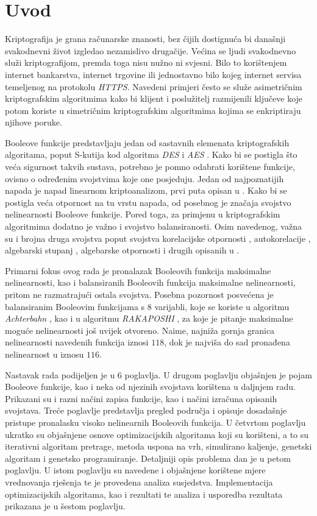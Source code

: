 \chapter{Uvod}
Kriptografija je grana računarske znanosti, bez čijih dostignuća bi današnji svakodnevni život izgledao nezamislivo drugačije.
Većina se ljudi svakodnevno služi kriptografijom, premda toga nisu nužno ni svjesni.
Bilo to korištenjem internet bankarstva, internet trgovine ili jednostavno bilo kojeg internet servisa temeljenog na protokolu \textit{HTTPS}.
Navedeni primjeri često se služe asimetričnim kriptografskim algoritmima kako bi klijent i poslužitelj razmijenili ključeve koje potom koriste u simetričnim kriptografskim algoritmima kojima se enkriptiraju njihove poruke.

Booleove funkcije predstavljaju jedan od sastavnih elemenata kriptografskih algoritama, poput S-kutija kod algoritma \textit{DES} i \textit{AES} \cite{daemen1999aes}.
Kako bi se postigla što veća sigurnost takvih sustava, potrebno je pomno odabrati korištene funkcije, ovisno o određenim svojstvima koje one posjeduju.
Jedan od najpoznatijih napada je napad linearnom kriptoanalizom, prvi puta opisan u \cite{golic1994linear}.
Kako bi se postigla veća otpornost na tu vrstu napada, od posebnog je značaja svojstvo nelinearnosti Booleove funkcije.
Pored toga, za primjenu u kriptografskim algoritmima dodatno je važno i svojstvo balansiranosti.
Osim navedenog, važna su i brojna druga svojstva poput svojstva korelacijske otpornosti , autokorelacije , algebarski stupanj , algebarske otpornosti  i drugih opisanih u \cite{CryptographicBooleanFunctions}.

Primarni fokus ovog rada je pronalazak Booleovih funkcija maksimalne nelinearnosti, kao i balansiranih Booleovih funkcija maksimalne nelinearnosti, pritom ne razmatrajući ostala svojstva.
Posebna pozornost posvećena je balansiranim Booleovim funkcijama s $8$ varijabli, koje se koriste u algoritmu \textit{Achterbahn} \cite{gammel2005achterbahn}, kao i u algoritmu \textit{RAKAPOSHI} \cite{cid2009rakaposhi}, za koje je pitanje maksimalne moguće nelinearnosti još uvijek otvoreno.
Naime, najniža gornja granica nelinearnosti navedenih funkcija iznosi $118$, dok je najviša do sad pronađena nelinearnost u iznosu $116$.

Nastavak rada podijeljen je u $6$ poglavlja.
U drugom poglavlju objašnjen je pojam Booleove funkcije, kao i neka od njezinih svojstava korištena u daljnjem radu.
Prikazani su i razni načini zapisa funkcije, kao i načini izračuna opisanih svojstava.
Treće poglavlje predstavlja pregled područja i opisuje dosadašnje pristupe pronalasku visoko nelinearnih Booleovih funkcija.
U četvrtom poglavlju ukratko su objašnjene osnove optimizacijskih algoritama koji su korišteni, a to su iterativni algoritam pretrage, metoda uspona na vrh, simulirano kaljenje, genetski algoritam i genetsko programiranje.
Detaljniji opis problema dan je u petom poglavlju.
U istom poglavlju su navedene i objašnjene korištene mjere vrednovanja rješenja te je provedena analiza susjedstva.
Implementacija optimizacijskih algoritama, kao i rezultati te analiza i usporedba rezultata prikazana je u šestom poglavlju. 